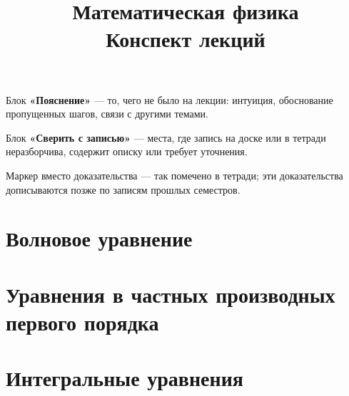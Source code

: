 \documentclass[12pt,a4paper]{article}
\title{\textbf{Математическая физика}\\[0.3em]\large Конспект лекций}
\author{}
\date{}
\begin{document}
\maketitle
\thispagestyle{empty}

\begin{idea}[title={Обозначения в конспекте}]
Блок \textbf{«Пояснение»} — то, чего не было на лекции: интуиция, обоснование
пропущенных шагов, связи с другими темами.

\medskip
Блок \textbf{«Сверить с записью»} — места, где запись на доске или в тетради
неразборчива, содержит описку или требует уточнения.

\medskip
Маркер \plusplus{} вместо доказательства — так помечено в тетради; эти доказательства
дописываются позже по записям прошлых семестров.
\end{idea}

\tableofcontents
\newpage

\renewcommand{\thesubsection}{\S\arabic{subsection}}



\newpage
\section{Волновое уравнение}


\newpage


\newpage


\newpage


\newpage
\section{Уравнения в частных производных первого порядка}


\newpage


\newpage


\newpage
\section{Интегральные уравнения}


\newpage


\newpage


\newpage


\newpage


\newpage

\end{document}
